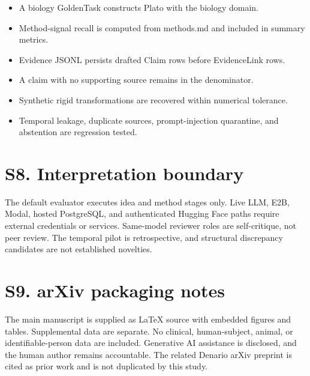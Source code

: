 \documentclass[11pt]{article}
\begin{document}
\begin{itemize}[leftmargin=*]

\item A biology GoldenTask constructs Plato with the biology domain.

\item Method-signal recall is computed from methods.md and included in summary metrics.

\item Evidence JSONL persists drafted Claim rows before EvidenceLink rows.

\item A claim with no supporting source remains in the denominator.

\item Synthetic rigid transformations are recovered within numerical tolerance.

\item Temporal leakage, duplicate sources, prompt-injection quarantine, and abstention are regression tested.

\end{itemize}

\section*{S8. Interpretation boundary}

The default evaluator executes idea and method stages only. Live LLM, E2B, Modal, hosted PostgreSQL, and authenticated Hugging Face paths require external credentials or services. Same-model reviewer roles are self-critique, not peer review. The temporal pilot is retrospective, and structural discrepancy candidates are not established novelties.

\section*{S9. arXiv packaging notes}

The main manuscript is supplied as LaTeX source with embedded figures and tables. Supplemental data are separate. No clinical, human-subject, animal, or identifiable-person data are included. Generative AI assistance is disclosed, and the human author remains accountable. The related Denario arXiv preprint is cited as prior work and is not duplicated by this study.
\end{document}
